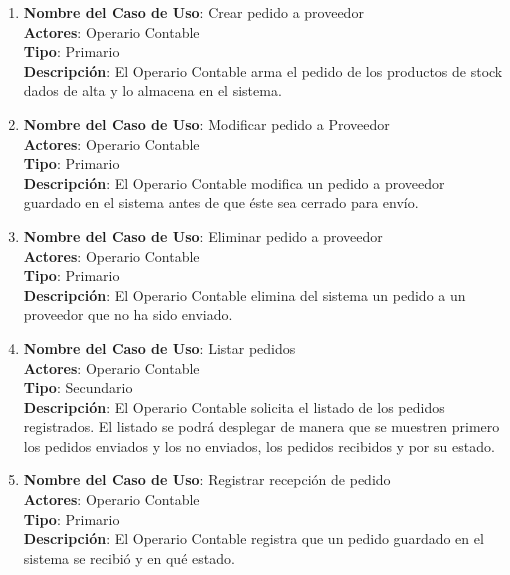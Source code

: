 \documentclass[12pt]{extarticle}
\begin{document}
\begin{spacing}{1.2}
\begin{enumerate}
            \item 	\textbf{Nombre del Caso de Uso}: Crear pedido a proveedor\\
                    \textbf{Actores}: Operario Contable\\
                    \textbf{Tipo}: Primario\\
                    \textbf{Descripción}: El Operario Contable arma el pedido de los productos de stock dados de alta y lo almacena en el sistema.

            \item 	\textbf{Nombre del Caso de Uso}: Modificar pedido a Proveedor\\
                    \textbf{Actores}: Operario Contable\\
                    \textbf{Tipo}: Primario\\
                    \textbf{Descripción}: El Operario Contable modifica un pedido a proveedor guardado en el sistema antes de que éste sea cerrado para envío.

            \item 	\textbf{Nombre del Caso de Uso}: Eliminar pedido a proveedor\\
                    \textbf{Actores}: Operario Contable\\
                    \textbf{Tipo}: Primario\\
                    \textbf{Descripción}: El Operario Contable elimina del sistema un pedido a un proveedor que no ha sido enviado.


            \item 	\textbf{Nombre del Caso de Uso}: Listar pedidos \\
                    \textbf{Actores}: Operario Contable\\
                    \textbf{Tipo}: Secundario\\
                    \textbf{Descripción}: El Operario Contable solicita el listado de los pedidos registrados. El listado se podrá desplegar de manera que se muestren primero los pedidos enviados y los no enviados, los pedidos recibidos y por su estado.

            \item 	\textbf{Nombre del Caso de Uso}: Registrar recepción de pedido\\
                    \textbf{Actores}: Operario Contable\\
                    \textbf{Tipo}: Primario\\
                    \textbf{Descripción}: El Operario Contable registra que un pedido guardado en el sistema se recibió y en qué estado. 


\end{enumerate}
\end{spacing}
\end{document}
